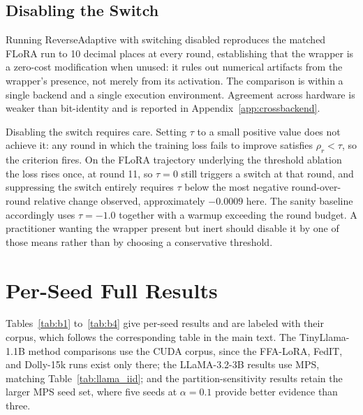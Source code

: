 \subsection{Disabling the Switch}
\label{app:noswitch}
Running ReverseAdaptive with switching disabled reproduces the matched FLoRA \cite{wang2024flora} run to 10 decimal places at every round, establishing that the wrapper is a zero-cost modification when unused: it rules out numerical artifacts from the wrapper's presence, not merely from its activation. The comparison is within a single backend and a single execution environment. Agreement across hardware is weaker than bit-identity and is reported in Appendix~\ref{app:crossbackend}.

Disabling the switch requires care. Setting $\tau$ to a small positive value does not achieve it: any round in which the training loss fails to improve satisfies $\rho_r < \tau$, so the criterion fires. On the FLoRA trajectory underlying the threshold ablation the loss rises once, at round 11, so $\tau{=}0$ still triggers a switch at that round, and suppressing the switch entirely requires $\tau$ below the most negative round-over-round relative change observed, approximately ${-}0.0009$ here. The sanity baseline accordingly uses $\tau{=}{-}1.0$ together with a warmup exceeding the round budget. A practitioner wanting the wrapper present but inert should disable it by one of those means rather than by choosing a conservative threshold.

\section{Per-Seed Full Results}
\label{app:perseed}
Tables~\ref{tab:b1} to~\ref{tab:b4} give per-seed results and are labeled with their corpus, which follows the corresponding table in the main text. The TinyLlama-1.1B method comparisons use the CUDA corpus, since the FFA-LoRA, FedIT, and Dolly-15k runs exist only there; the LLaMA-3.2-3B results use MPS, matching Table~\ref{tab:llama_iid}; and the partition-sensitivity results retain the larger MPS seed set, where five seeds at $\alpha{=}0.1$ provide better evidence than three.

